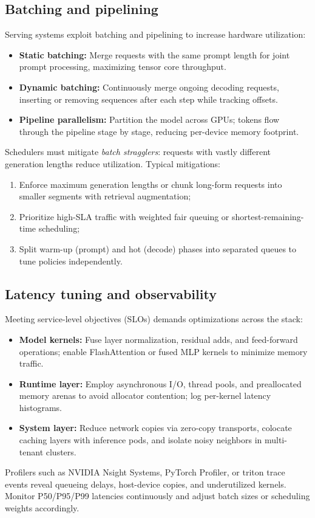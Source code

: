 \documentclass{article}
\begin{document}
\subsection{Batching and pipelining}
Serving systems exploit batching and pipelining to increase hardware utilization:
\begin{itemize}
  \item \textbf{Static batching:} Merge requests with the same prompt length for joint prompt processing, maximizing tensor core throughput.
  \item \textbf{Dynamic batching:} Continuously merge ongoing decoding requests, inserting or removing sequences after each step while tracking offsets.
  \item \textbf{Pipeline parallelism:} Partition the model across GPUs; tokens flow through the pipeline stage by stage, reducing per-device memory footprint.
\end{itemize}
Schedulers must mitigate \emph{batch stragglers}: requests with vastly different generation lengths reduce utilization. Typical mitigations:
\begin{enumerate}
  \item Enforce maximum generation lengths or chunk long-form requests into smaller segments with retrieval augmentation;
  \item Prioritize high-SLA traffic with weighted fair queuing or shortest-remaining-time scheduling;
  \item Split warm-up (prompt) and hot (decode) phases into separated queues to tune policies independently.
\end{enumerate}

\subsection{Latency tuning and observability}
Meeting service-level objectives (SLOs) demands optimizations across the stack:
\begin{itemize}
  \item \textbf{Model kernels:} Fuse layer normalization, residual adds, and feed-forward operations; enable FlashAttention or fused MLP kernels to minimize memory traffic.
  \item \textbf{Runtime layer:} Employ asynchronous I/O, thread pools, and preallocated memory arenas to avoid allocator contention; log per-kernel latency histograms.
  \item \textbf{System layer:} Reduce network copies via zero-copy transports, colocate caching layers with inference pods, and isolate noisy neighbors in multi-tenant clusters.
\end{itemize}
Profilers such as NVIDIA Nsight Systems, PyTorch Profiler, or triton trace events reveal queueing delays, host-device copies, and underutilized kernels. Monitor P50/P95/P99 latencies continuously and adjust batch sizes or scheduling weights accordingly.
\end{document}
